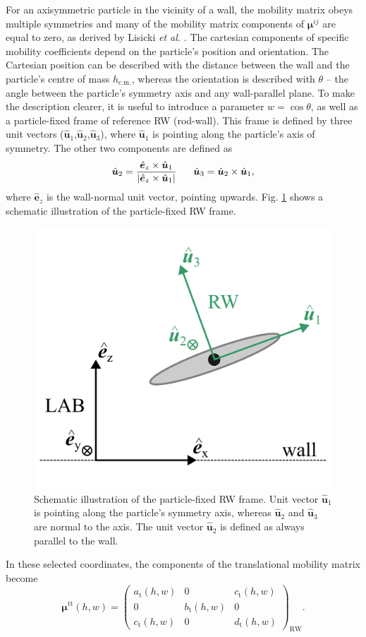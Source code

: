\documentclass{master_thesis}
\begin{document}
For an axisymmetric particle in the vicinity of a wall, the mobility matrix obeys multiple symmetries and many of the mobility matrix components of $\bm{\mu}^{ij}$ are equal to zero, as derived by Lisicki \textit{et al.} \cite{lisicki2016}. The cartesian components of specific mobility coefficients depend on the particle's position and orientation. The Cartesian position can be described with the distance between the wall and the particle's centre of mass $h_{\textrm{c.m.}}$, whereas the orientation is described with $\theta$ -- the angle between the particle's symmetry axis and any wall-parallel plane. To make the description clearer, it is useful to introduce a parameter $w=\cos\theta$, as well as a particle-fixed frame of reference RW (rod-wall). This frame is defined by three unit vectors ($\hat{\boldsymbol{u}}_1$,$\hat{\boldsymbol{u}}_2$,$\hat{\boldsymbol{u}}_3$), where $\hat{\boldsymbol{u}}_1$ is pointing along the particle's axis of symmetry. The other two components are defined as
\begin{equation}
    \hat{\boldsymbol{u}}_2=\frac{\hat{\boldsymbol{e}}_z\times\hat{\boldsymbol{u}}_1}{|\hat{\boldsymbol{e}}_z\times\hat{\boldsymbol{u}}_1|} \hspace{.6cm} \hat{\boldsymbol{u}}_3=\hat{\boldsymbol{u}}_2\times\hat{\boldsymbol{u}}_1,
\label{eqn:wr_frame}
\end{equation}
where $\hat{\boldsymbol{e}}_z$ is the wall-normal unit vector, pointing upwards. Fig. \ref{fig:wr_frame} shows a schematic illustration of the particle-fixed RW frame.
\begin{figure}
    \centering
    \includegraphics[width=0.43\linewidth]{figures/rw_frame.png}
    \caption{Schematic illustration of the particle-fixed RW frame. Unit vector $\hat{\boldsymbol{u}}_1$ is pointing along the particle's symmetry axis, whereas $\hat{\boldsymbol{u}}_2$ and $\hat{\boldsymbol{u}}_3$ are normal to the axis. The unit vector $\hat{\boldsymbol{u}}_2$ is defined as always parallel to the wall.}
    \label{fig:wr_frame}
\end{figure}
In these selected coordinates, the components of the translational mobility matrix become
\begin{equation}
    \bm{\mu}^{\textrm{tt}}(h,w)=\begin{pmatrix}
    a_{\textrm{t}}(h,w) & 0 & c_{\textrm{t}}(h,w) \\
    0 & b_{\textrm{t}}(h,w) & 0 \\
    c_{\textrm{t}}(h,w) & 0 & d_{\textrm{t}}(h,w)
    \end{pmatrix}_{\textrm{RW}}.
\label{eqn:mobility_tt}
\end{equation}
\end{document}
